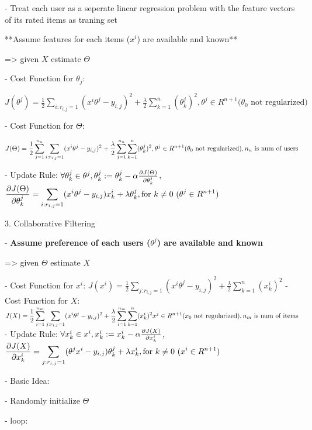 - Treat each user as a seperate linear regression problem with the feature vectors of its rated items as traning set

**Assume features for each items ($x^i$) are available and known**

=> given $X$ estimate $\Theta$ 

- Cost Function for $\theta_j$: 

$\displaystyle J(\theta^j)= \frac1 {2} \sum_{i:r_{i,j}=1}(x^i\theta^j-y_{i,j})^2+\frac \lambda {2} \sum_{k=1}^n(\theta^j_k)^2, \theta^j \in R^{n+1} (\theta_0 \text{ not regularized)}$

- Cost Function for $\Theta$:

$\displaystyle J(\Theta)= \frac1{2} \sum_{j=1}^{n_u} \sum_{i:r_{i,j}=1}(x^i\theta^j-y_{i,j})^2+\frac \lambda {2} \sum_{j=1}^{n_u} \sum_{k=1}^n(\theta^j_k)^2, \\ \theta^j \in R^{n+1} (\theta_0 \text{ not regularized)}, \space n_u \text{ is num of users}$ 

- Update Rule: \(\forall \theta^j_k \in \theta^j, \theta^j_k := \theta^j_k-\alpha\large\frac{\partial J(\Theta)}{\partial\theta^j_k}\), \(\displaystyle \frac{\partial J(\Theta)}{\partial\theta^j_k}=\sum_{i:r_{i,j}=1}(x^i\theta^j-y_{i,j})x_k^i+ \lambda \theta_k^j, \space \text{for $k \neq 0$ ($\theta^j \in R^{n+1}$)}\) 

3. Collaborative Filtering

- \textbf{Assume preference of each users ($\theta^j$) are available and known}

=> given $\Theta$ estimate $X$ 

- Cost Function for $x^i$: $\displaystyle J(x^i)=\frac 1 2 \sum_{j:r_{i,j}=1} (x^i\theta^j - y_{i,j})^2 + \frac \lambda 2 \sum ^n_{k=1} (x_k^i)^2$ 
- Cost Function for $X$: $\displaystyle J(X)=\frac 1 2 \sum_{i=1}^{n_m} \sum_{j:r_{i,j}=1} (x^i\theta^j - y_{i,j})^2 + \frac \lambda 2 \sum_{i=1}^{n_m} \sum ^n_{k=1} (x_k^i)^2 \\ x^j \in R^{n+1} (x_0 \text{ not regularized)}, \space n_m \text{ is num of items}$ 
- Update Rule: \(\forall x^i_k \in x^i, x^i_k := x^i_k-\alpha\large\frac{\partial J(X)}{\partial x^i_k}\), \(\displaystyle \frac{\partial J(X)}{\partial x^i_k}=\sum_{j:r_{i,j}=1}(\theta^jx^i-y_{i,j})\theta_k^j+ \lambda x_k^i, \space \text{for $k \neq 0$ $(x^i \in R^{n+1}$)}\)

- Basic Idea: 

- Randomly initialize $\Theta$ 

- loop:

